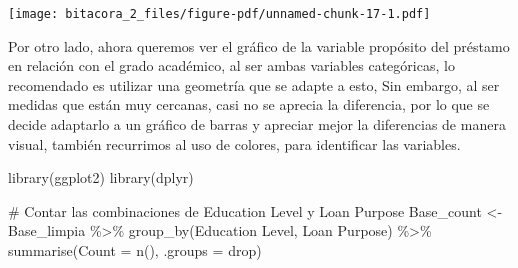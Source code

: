 \documentclass[
  letterpaper,
  DIV=11,
  numbers=noendperiod]{scrreprt}
\newenvironment{Shaded}{\begin{snugshade}}{\end{snugshade}}
\newcommand{\AttributeTok}[1]{\textcolor[rgb]{0.40,0.45,0.13}{#1}}
\newcommand{\CommentTok}[1]{\textcolor[rgb]{0.37,0.37,0.37}{#1}}
\newcommand{\FunctionTok}[1]{\textcolor[rgb]{0.28,0.35,0.67}{#1}}
\newcommand{\NormalTok}[1]{\textcolor[rgb]{0.00,0.23,0.31}{#1}}
\newcommand{\OtherTok}[1]{\textcolor[rgb]{0.00,0.23,0.31}{#1}}
\newcommand{\SpecialCharTok}[1]{\textcolor[rgb]{0.37,0.37,0.37}{#1}}
\newcommand{\StringTok}[1]{\textcolor[rgb]{0.13,0.47,0.30}{#1}}
\begin{document}
\texttt{[image: bitacora\_2\_files/figure-pdf/unnamed-chunk-17-1.pdf]}

Por otro lado, ahora queremos ver el gráfico de la variable propósito
del préstamo en relación con el grado académico, al ser ambas variables
categóricas, lo recomendado es utilizar una geometría que se adapte a
esto, Sin embargo, al ser medidas que están muy cercanas, casi no se
aprecia la diferencia, por lo que se decide adaptarlo a un gráfico de
barras y apreciar mejor la diferencias de manera visual, también
recurrimos al uso de colores, para identificar las variables.

\begin{Shaded}
\begin{Highlighting}[]
\FunctionTok{library}\NormalTok{(ggplot2)}
\FunctionTok{library}\NormalTok{(dplyr)}

\CommentTok{\# Contar las combinaciones de Education Level y Loan Purpose}
\NormalTok{Base\_count }\OtherTok{\textless{}{-}}\NormalTok{ Base\_limpia }\SpecialCharTok{\%\textgreater{}\%}
  \FunctionTok{group\_by}\NormalTok{(}\StringTok{\textasciigrave{}}\AttributeTok{Education Level}\StringTok{\textasciigrave{}}\NormalTok{, }\StringTok{\textasciigrave{}}\AttributeTok{Loan Purpose}\StringTok{\textasciigrave{}}\NormalTok{) }\SpecialCharTok{\%\textgreater{}\%}
  \FunctionTok{summarise}\NormalTok{(}\AttributeTok{Count =} \FunctionTok{n}\NormalTok{(), }\AttributeTok{.groups =} \StringTok{\textquotesingle{}drop\textquotesingle{}}\NormalTok{)}


\end{Highlighting}
\end{Shaded}
\end{document}

